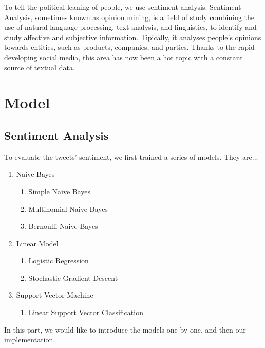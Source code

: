 \documentclass[12pt,a4paper]{article}
\begin{document}
  To tell the political leaning of people, we use sentiment analysis. Sentiment Analysis, sometimes known as opinion mining, is a field of study combining the use of natural language processing, text analysis, and linguistics, to identify and study affective and subjective information. Tipically, it analyses people’s opinions towards entities, such as products, companies, and parties. Thanks to the rapid-developing social media, this area has now been a hot topic with a constant source of textual data.



\section{Model}

  \subsection{Sentiment Analysis}

    To evaluate the tweets' sentiment, we first trained a series of models. They are...

    \begin{enumerate}
      \item Naive Bayes
            \begin{enumerate}
              \item Simple Naive Bayes
              \item Multinomial Naive Bayes
              \item Bernoulli Naive Bayes
            \end{enumerate}
      \item Linear Model
            \begin{enumerate}
              \item Logistic Regression
              \item Stochastic Gradient Descent
            \end{enumerate}
      \item Support Vector Machine
            \begin{enumerate}
              \item Linear Support Vector Classification
            \end{enumerate}
    \end{enumerate}

    In this part, we would like to introduce the models one by one, and then our implementation.
\end{document}
